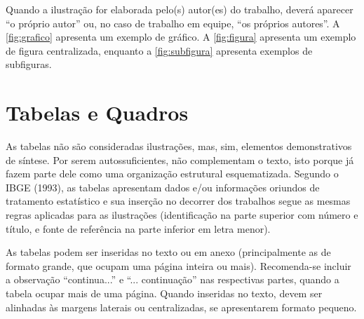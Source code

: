 \documentclass[12pt,oneside,a4paper,chapter=TITLE,section=TITLE,sumario=tradicional]{abntex2}
\begin{document}
Quando a ilustração for elaborada pelo(s) autor(es) do trabalho, deverá 
aparecer ``o próprio autor'' ou, no caso de trabalho em equipe, ``os próprios 
autores''. A \autoref{fig:grafico} apresenta um exemplo de gráfico. A 
\autoref{fig:figura} apresenta um exemplo de figura centralizada, enquanto a 
\autoref{fig:subfigura} apresenta exemplos de subfiguras.

\begin{grafico}[htb]
\end{grafico}

\begin{figure}[htb]
\end{figure}

\begin{figure}[htb]
    \hfil
    \hfil
    
    \hfil
    \hfil
    
\end{figure}

\section{Tabelas e Quadros}
\label{sec:tabelas}

As tabelas não são consideradas ilustrações, mas, sim, elementos demonstrativos 
de síntese. Por serem autossuficientes, não complementam o texto, isto porque 
já fazem parte dele como uma organização estrutural esquematizada. Segundo o 
IBGE (1993), as tabelas apresentam dados e/ou informações oriundos de 
tratamento estatístico e sua inserção no decorrer dos trabalhos segue as mesmas 
regras aplicadas para as ilustrações (identificação na parte superior com 
número e título, e fonte de referência na parte inferior em letra menor).

As tabelas podem ser inseridas no texto ou em anexo (principalmente as de 
formato grande, que ocupam uma página inteira ou mais). Recomenda-se incluir a 
observação ``continua...'' e ``... continuação'' nas respectivas partes, quando 
a tabela ocupar mais de uma página. Quando inseridas no texto, devem ser 
alinhadas às margens laterais ou centralizadas, se apresentarem formato pequeno.
\end{document}
